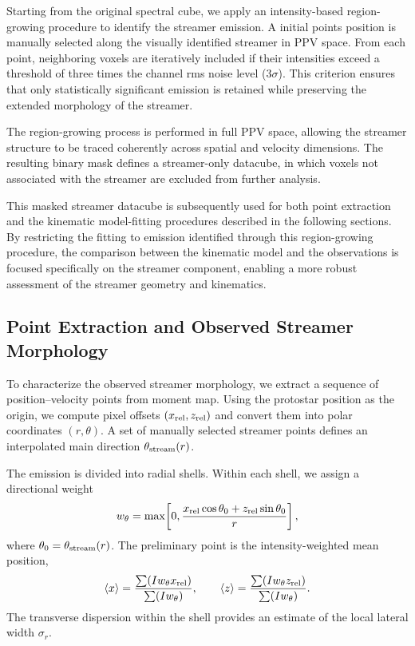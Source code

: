 Starting from the original spectral cube, we apply an intensity-based region-growing procedure to identify the streamer emission. A initial points position is manually selected along the visually identified streamer in PPV space. From each point, neighboring voxels are iteratively included if their intensities exceed a threshold of three times the channel rms noise level ($3\sigma$). This criterion ensures that only statistically significant emission is retained while preserving the extended morphology of the streamer.

The region-growing process is performed in full PPV space, allowing the streamer structure to be traced coherently across spatial and velocity dimensions. The resulting binary mask defines a streamer-only datacube, in which voxels not associated with the streamer are excluded from further analysis.

This masked streamer datacube is subsequently used for both point extraction and the kinematic model-fitting procedures described in the following sections. By restricting the fitting to emission identified through this region-growing procedure, the comparison between the kinematic model and the observations is focused specifically on the streamer component, enabling a more robust assessment of the streamer geometry and kinematics.

\subsection{Point Extraction and Observed Streamer Morphology}

To characterize the observed streamer morphology, we extract a sequence of position--velocity points from moment map. Using the protostar position as the origin, we compute pixel offsets $(x_{\rm rel},z_{\rm rel})$ and convert them into polar coordinates $(r,\theta)$. A set of manually selected streamer points defines an interpolated main direction $\theta_{\rm stream}(r)$.

The emission is divided into radial shells. Within each shell, we assign a directional weight
\[
w_\theta = \max\!\left[0,\frac{x_{\rm rel}\cos\theta_0 + z_{\rm rel}\sin\theta_0}{r}\right],
\]
where $\theta_0=\theta_{\rm stream}(r)$. The preliminary point is the intensity-weighted mean position,
\[
\langle x\rangle = \frac{\sum(Iw_\theta x_{\rm rel})}{\sum(Iw_\theta)},\qquad
\langle z\rangle = \frac{\sum(Iw_\theta z_{\rm rel})}{\sum(Iw_\theta)}.
\]
The transverse dispersion within the shell provides an estimate of the local lateral width $\sigma_r$.

